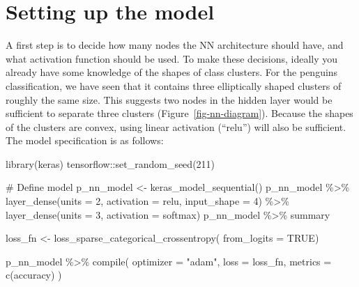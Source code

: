 \documentclass[
  letterpaper,
]{krantz}
\newenvironment{Shaded}{\begin{snugshade}}{\end{snugshade}}
\newcommand{\AttributeTok}[1]{\textcolor[rgb]{0.40,0.45,0.13}{#1}}
\newcommand{\CommentTok}[1]{\textcolor[rgb]{0.37,0.37,0.37}{#1}}
\newcommand{\ConstantTok}[1]{\textcolor[rgb]{0.56,0.35,0.01}{#1}}
\newcommand{\DecValTok}[1]{\textcolor[rgb]{0.68,0.00,0.00}{#1}}
\newcommand{\FunctionTok}[1]{\textcolor[rgb]{0.28,0.35,0.67}{#1}}
\newcommand{\NormalTok}[1]{\textcolor[rgb]{0.00,0.23,0.31}{#1}}
\newcommand{\OtherTok}[1]{\textcolor[rgb]{0.00,0.23,0.31}{#1}}
\newcommand{\SpecialCharTok}[1]{\textcolor[rgb]{0.37,0.37,0.37}{#1}}
\newcommand{\StringTok}[1]{\textcolor[rgb]{0.13,0.47,0.30}{#1}}
\begin{document}
\section{Setting up the model}\label{setting-up-the-model}


A first step is to decide how many nodes the NN architecture should
have, and what activation function should be used. To make these
decisions, ideally you already have some knowledge of the shapes of
class clusters. For the penguins classification, we have seen that it
contains three elliptically shaped clusters of roughly the same size.
This suggests two nodes in the hidden layer would be sufficient to
separate three clusters (Figure~\ref{fig-nn-diagram}). Because the
shapes of the clusters are convex, using linear activation (``relu'')
will also be sufficient. The model specification is as follows:

\begin{Shaded}
\begin{Highlighting}[]
\FunctionTok{library}\NormalTok{(keras)}
\NormalTok{tensorflow}\SpecialCharTok{::}\FunctionTok{set\_random\_seed}\NormalTok{(}\DecValTok{211}\NormalTok{)}

\CommentTok{\# Define model}
\NormalTok{p\_nn\_model }\OtherTok{\textless{}{-}} \FunctionTok{keras\_model\_sequential}\NormalTok{()}
\NormalTok{p\_nn\_model }\SpecialCharTok{\%\textgreater{}\%} 
  \FunctionTok{layer\_dense}\NormalTok{(}\AttributeTok{units =} \DecValTok{2}\NormalTok{, }\AttributeTok{activation =} \StringTok{\textquotesingle{}relu\textquotesingle{}}\NormalTok{, }
              \AttributeTok{input\_shape =} \DecValTok{4}\NormalTok{) }\SpecialCharTok{\%\textgreater{}\%} 
  \FunctionTok{layer\_dense}\NormalTok{(}\AttributeTok{units =} \DecValTok{3}\NormalTok{, }\AttributeTok{activation =} \StringTok{\textquotesingle{}softmax\textquotesingle{}}\NormalTok{)}
\NormalTok{p\_nn\_model }\SpecialCharTok{\%\textgreater{}\%}\NormalTok{ summary}

\NormalTok{loss\_fn }\OtherTok{\textless{}{-}} \FunctionTok{loss\_sparse\_categorical\_crossentropy}\NormalTok{(}
  \AttributeTok{from\_logits =} \ConstantTok{TRUE}\NormalTok{)}

\NormalTok{p\_nn\_model }\SpecialCharTok{\%\textgreater{}\%} \FunctionTok{compile}\NormalTok{(}
  \AttributeTok{optimizer =} \StringTok{"adam"}\NormalTok{,}
  \AttributeTok{loss      =}\NormalTok{ loss\_fn,}
  \AttributeTok{metrics   =} \FunctionTok{c}\NormalTok{(}\StringTok{\textquotesingle{}accuracy\textquotesingle{}}\NormalTok{)}
\NormalTok{)}
\end{Highlighting}
\end{Shaded}
\end{document}

